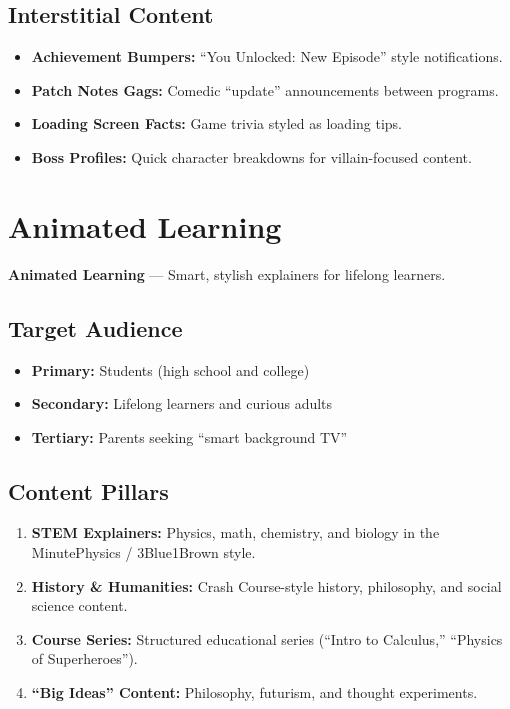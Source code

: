 \documentclass[12pt,letterpaper,twoside]{report}
\begin{document}
\subsection{Interstitial Content}

\begin{itemize}[leftmargin=1.5cm]
    \item \textbf{Achievement Bumpers:} ``You Unlocked: New Episode'' style notifications.
    \item \textbf{Patch Notes Gags:} Comedic ``update'' announcements between programs.
    \item \textbf{Loading Screen Facts:} Game trivia styled as loading tips.
    \item \textbf{Boss Profiles:} Quick character breakdowns for villain-focused content.
\end{itemize}

\section{Animated Learning}
\label{sec:learning}

\begin{channelbox}[learningorange]
\textbf{Animated Learning} --- Smart, stylish explainers for lifelong learners.
\end{channelbox}

\subsection{Target Audience}

\begin{itemize}[leftmargin=1.5cm]
    \item \textbf{Primary:} Students (high school and college)
    \item \textbf{Secondary:} Lifelong learners and curious adults
    \item \textbf{Tertiary:} Parents seeking ``smart background TV''
\end{itemize}

\subsection{Content Pillars}

\begin{enumerate}[leftmargin=2cm]
    \item \textbf{STEM Explainers:} Physics, math, chemistry, and biology in the MinutePhysics / 3Blue1Brown style.
    \item \textbf{History \& Humanities:} Crash Course-style history, philosophy, and social science content.
    \item \textbf{Course Series:} Structured educational series (``Intro to Calculus,'' ``Physics of Superheroes'').
    \item \textbf{``Big Ideas'' Content:} Philosophy, futurism, and thought experiments.
\end{enumerate}
\end{document}
